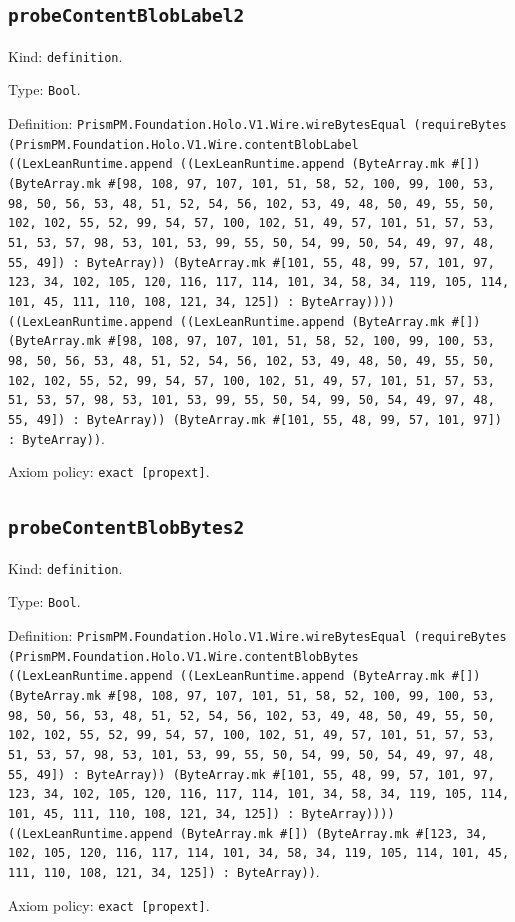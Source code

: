 \documentclass[11pt]{article}
\begin{document}
\subsection*{\texttt{probeContentBlobLabel2}}
\noindent Kind: \texttt{definition}.\par
\noindent Type: \texttt{Bool}.\par
\noindent Definition: \texttt{PrismPM.Foundation.Holo.V1.Wire.wireBytesEqual (requireBytes (PrismPM.Foundation.Holo.V1.Wire.contentBlobLabel ((LexLeanRuntime.append ((LexLeanRuntime.append (ByteArray.mk \#[]) (ByteArray.mk \#[98, 108, 97, 107, 101, 51, 58, 52, 100, 99, 100, 53, 98, 50, 56, 53, 48, 51, 52, 54, 56, 102, 53, 49, 48, 50, 49, 55, 50, 102, 102, 55, 52, 99, 54, 57, 100, 102, 51, 49, 57, 101, 51, 57, 53, 51, 53, 57, 98, 53, 101, 53, 99, 55, 50, 54, 99, 50, 54, 49, 97, 48, 55, 49]) : ByteArray)) (ByteArray.mk \#[101, 55, 48, 99, 57, 101, 97, 123, 34, 102, 105, 120, 116, 117, 114, 101, 34, 58, 34, 119, 105, 114, 101, 45, 111, 110, 108, 121, 34, 125]) : ByteArray)))) ((LexLeanRuntime.append ((LexLeanRuntime.append (ByteArray.mk \#[]) (ByteArray.mk \#[98, 108, 97, 107, 101, 51, 58, 52, 100, 99, 100, 53, 98, 50, 56, 53, 48, 51, 52, 54, 56, 102, 53, 49, 48, 50, 49, 55, 50, 102, 102, 55, 52, 99, 54, 57, 100, 102, 51, 49, 57, 101, 51, 57, 53, 51, 53, 57, 98, 53, 101, 53, 99, 55, 50, 54, 99, 50, 54, 49, 97, 48, 55, 49]) : ByteArray)) (ByteArray.mk \#[101, 55, 48, 99, 57, 101, 97]) : ByteArray))}.\par
\noindent Axiom policy: \texttt{exact [propext]}.\par
\subsection*{\texttt{probeContentBlobBytes2}}
\noindent Kind: \texttt{definition}.\par
\noindent Type: \texttt{Bool}.\par
\noindent Definition: \texttt{PrismPM.Foundation.Holo.V1.Wire.wireBytesEqual (requireBytes (PrismPM.Foundation.Holo.V1.Wire.contentBlobBytes ((LexLeanRuntime.append ((LexLeanRuntime.append (ByteArray.mk \#[]) (ByteArray.mk \#[98, 108, 97, 107, 101, 51, 58, 52, 100, 99, 100, 53, 98, 50, 56, 53, 48, 51, 52, 54, 56, 102, 53, 49, 48, 50, 49, 55, 50, 102, 102, 55, 52, 99, 54, 57, 100, 102, 51, 49, 57, 101, 51, 57, 53, 51, 53, 57, 98, 53, 101, 53, 99, 55, 50, 54, 99, 50, 54, 49, 97, 48, 55, 49]) : ByteArray)) (ByteArray.mk \#[101, 55, 48, 99, 57, 101, 97, 123, 34, 102, 105, 120, 116, 117, 114, 101, 34, 58, 34, 119, 105, 114, 101, 45, 111, 110, 108, 121, 34, 125]) : ByteArray)))) ((LexLeanRuntime.append (ByteArray.mk \#[]) (ByteArray.mk \#[123, 34, 102, 105, 120, 116, 117, 114, 101, 34, 58, 34, 119, 105, 114, 101, 45, 111, 110, 108, 121, 34, 125]) : ByteArray))}.\par
\noindent Axiom policy: \texttt{exact [propext]}.\par
\end{document}

